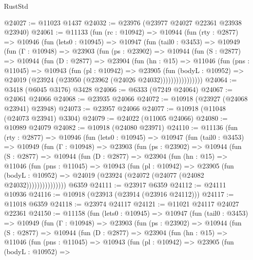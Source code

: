 \begin{lexlean}{RustStd}
\begin{coremodule}
{{{{{{{{{{{{{{{{{{{@24027 := @11023 @1437
@24032 := @23976 (@23977 @24027 @22361 @23938 @23940)
@24061 := @11133
    (fun (rc : @10942) =>
    @10944
      (fun (rty : @2877) =>
      @10946
        (fun (lets0 : @10945) =>
        @10947
          (fun (tail0 : @3453) =>
          @10949
            (fun (Γ : @10948) =>
            @23903
              (fun (ps : @23902) =>
              @10944
                (fun (S : @2877) =>
                @10944
                  (fun (D : @2877) =>
                  @23904
                    (fun (hn : @15) =>
                    @11046
                      (fun (pns : @11045) =>
                      @10943
                        (fun (pl : @10942) =>
                        @23905
                          (fun (bodyL : @10952) =>
                          @24019 (@23924 (@23950 (@23962 (@24026 @24032))))))))))))))))
@24064 := @3418 (@6045 @3176) @3428
@24066 := @6333 (@7249 @24064)
@24067 := @24061 @24066
@24068 := @23935 @24066
@24072 := @10918 (@23927 (@24068 @23941) @23948)
@24073 := @23957 @24066
@24077 := @10918 (@11048 (@24073 @23941) @3304)
@24079 := @24022 (@11005 @24066)
@24080 := @10989 @24079
@24082 := @10918 (@24080 @23971)
@24110 := @11136
    (fun (rty : @2877) =>
    @10946
      (fun (lets0 : @10945) =>
      @10947
        (fun (tail0 : @3453) =>
        @10949
          (fun (Γ : @10948) =>
          @23903
            (fun (ps : @23902) =>
            @10944
              (fun (S : @2877) =>
              @10944
                (fun (D : @2877) =>
                @23904
                  (fun (hn : @15) =>
                  @11046
                    (fun (pns : @11045) =>
                    @10943
                      (fun (pl : @10942) =>
                      @23905
                        (fun (bodyL : @10952) =>
                        @24019 (@23924 (@24072 (@24077 (@24082 @24032)))))))))))))))
    @6359
@24111 := @23917 @6359
@24112 := @24111 @10936
@24116 := @10918 (@23913 (@23914 (@23916 @24112)))
@24117 := @11018 @6359
@24118 := @23974 @24117
@24121 := @11021 @24117 @24027 @22361
@24150 := @11158
    (fun (lets0 : @10945) =>
    @10947
      (fun (tail0 : @3453) =>
      @10949
        (fun (Γ : @10948) =>
        @23903
          (fun (ps : @23902) =>
          @10944
            (fun (S : @2877) =>
            @10944
              (fun (D : @2877) =>
              @23904
                (fun (hn : @15) =>
                @11046
                  (fun (pns : @11045) =>
                  @10943
                    (fun (pl : @10942) =>
                    @23905
                      (fun (bodyL : @10952) =>
}}}}}}}}}}}}}}}}}}}
\end{coremodule}
\end{lexlean}
